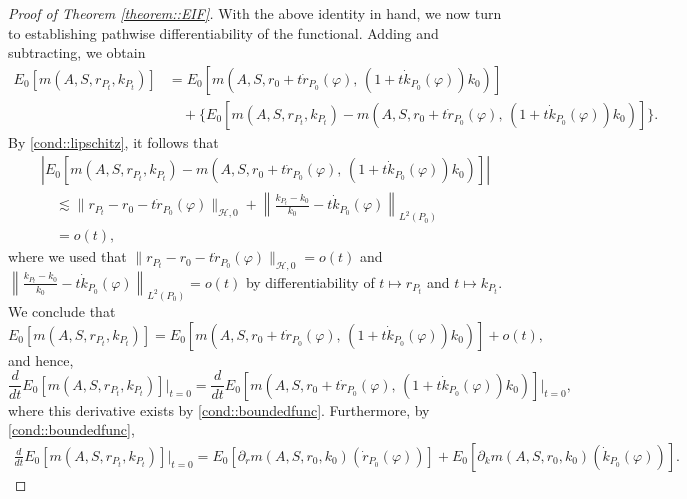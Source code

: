 \documentclass[11pt]{article}
\theoremstyle{plain}
\begin{document}
\begin{proof}[Proof of Theorem \ref{theorem::EIF}]
With the above identity in hand, we now turn to establishing pathwise differentiability of the functional. Adding and subtracting, we obtain
\begin{align*}
    E_0[m(A,S,r_{P_t},k_{P_t})] 
    &= E_0[m(A,S,r_0 + t \dot{r}_{P_0}(\varphi),\, (1+t\dot{k}_{P_0}(\varphi))k_0)] \\
    &\quad + \Big\{E_0[m(A,S,r_{P_t},k_{P_t}) - m(A,S,r_0 + t \dot{r}_{P_0}(\varphi),\, (1+t\dot{k}_{P_0}(\varphi))k_0)]\Big\}.
\end{align*} 
By \ref{cond::lipschitz}, it follows that
\begin{align*}
   &\left|E_0[m(A,S,r_{P_t},k_{P_t}) - m(A,S,r_0 + t \dot{r}_{P_0}(\varphi),\, (1+t\dot{k}_{P_0}(\varphi))k_0)]\right|  \\
   &\quad \lesssim \|r_{P_t} - r_0 - t \dot{r}_{P_0}(\varphi)\|_{\mathcal{H},0} 
   + \left\|\frac{k_{P_t}-k_0}{k_0} - t \dot{k}_{P_0}(\varphi)\right\|_{L^2(P_0)} \\
   &\quad = o(t),
\end{align*}
where we used that $\|r_{P_t} - r_0 - t \dot{r}_{P_0}(\varphi)\|_{\mathcal{H},0} = o(t)$ and $\left\|\frac{k_{P_t}-k_0}{k_0} - t \dot{k}_{P_0}(\varphi)\right\|_{L^2(P_0)} = o(t)$ by differentiability of $t \mapsto r_{P_t}$ and $t \mapsto k_{P_t}$. We conclude that
\[
E_0[m(A,S,r_{P_t},k_{P_t})] 
= E_0[m(A,S,r_0 + t \dot{r}_{P_0}(\varphi),\, (1+t\dot{k}_{P_0}(\varphi))k_0)] + o(t),
\]
and hence,
\[
\frac{d}{dt} E_0[m(A,S,r_{P_t},k_{P_t})]\Big|_{t=0} 
= \frac{d}{dt} E_0[m(A,S,r_0 + t \dot{r}_{P_0}(\varphi),\, (1+t\dot{k}_{P_0}(\varphi))k_0)]\Big|_{t=0},
\]
where this derivative exists by \ref{cond::boundedfunc}. Furthermore, by \ref{cond::boundedfunc}, 
\begin{align*}
    \frac{d}{dt} E_0[m(A,S,r_{P_t},k_{P_t})]\Big|_{t=0} =E_0\left[\partial_r m(A,S,r_0,k_0)(\dot{r}_{P_0}(\varphi))\right] + E_0\left[\partial_k m(A,S,r_0,k_0)(\dot{k}_{P_0}(\varphi))\right].
\end{align*}



\end{proof}
\end{document}
